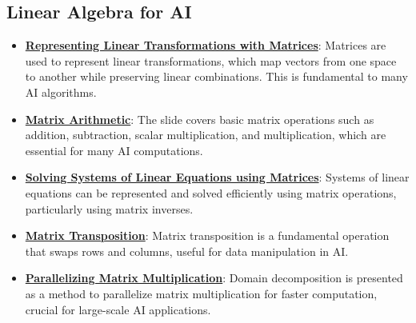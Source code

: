 \documentclass{article}%
\begin{document}
\subsection{Linear Algebra for AI}%
\label{subsec:LinearAlgebraforAI}%
\begin{itemize}[leftmargin=*]%
\item \href{https://purdue.brightspace.com/d2l/common/assets/pdfjs-d2l-dist/1.0.14-legacy/web/viewer.html?file=\%2Fcontent\%2Fenforced\%2F1095467-wl.202510.CS.24300.001\%2F04L1-Linear Algebra Primer.pdf\%3Fou\%3D1095467\&lang=en-us\&container=d2l-fileviewer-rendered-pdf\&fullscreen=d2l-fileviewer-rendered-pdf-dialog\&height=667#page=5}{\textbf{Representing Linear Transformations with Matrices}}: Matrices are used to represent linear transformations, which map vectors from one space to another while preserving linear combinations. This is fundamental to many AI algorithms.%
\item \href{https://purdue.brightspace.com/d2l/common/assets/pdfjs-d2l-dist/1.0.14-legacy/web/viewer.html?file=\%2Fcontent\%2Fenforced\%2F1095467-wl.202510.CS.24300.001\%2F04L1-Linear Algebra Primer.pdf\%3Fou\%3D1095467\&lang=en-us\&container=d2l-fileviewer-rendered-pdf\&fullscreen=d2l-fileviewer-rendered-pdf-dialog\&height=667#page=9}{\textbf{Matrix Arithmetic}}: The slide covers basic matrix operations such as addition, subtraction, scalar multiplication, and multiplication, which are essential for many AI computations.%
\item \href{https://purdue.brightspace.com/d2l/common/assets/pdfjs-d2l-dist/1.0.14-legacy/web/viewer.html?file=\%2Fcontent\%2Fenforced\%2F1095467-wl.202510.CS.24300.001\%2F04L1-Linear Algebra Primer.pdf\%3Fou\%3D1095467\&lang=en-us\&container=d2l-fileviewer-rendered-pdf\&fullscreen=d2l-fileviewer-rendered-pdf-dialog\&height=667#page=11}{\textbf{Solving Systems of Linear Equations using Matrices}}: Systems of linear equations can be represented and solved efficiently using matrix operations, particularly using matrix inverses.%
\item \href{https://purdue.brightspace.com/d2l/common/assets/pdfjs-d2l-dist/1.0.14-legacy/web/viewer.html?file=\%2Fcontent\%2Fenforced\%2F1095467-wl.202510.CS.24300.001\%2F04L1-Linear Algebra Primer.pdf\%3Fou\%3D1095467\&lang=en-us\&container=d2l-fileviewer-rendered-pdf\&fullscreen=d2l-fileviewer-rendered-pdf-dialog\&height=667#page=16}{\textbf{Matrix Transposition}}: Matrix transposition is a fundamental operation that swaps rows and columns, useful for data manipulation in AI.%
\item \href{https://purdue.brightspace.com/d2l/common/assets/pdfjs-d2l-dist/1.0.14-legacy/web/viewer.html?file=\%2Fcontent\%2Fenforced\%2F1095467-wl.202510.CS.24300.001\%2F04L1-Linear Algebra Primer.pdf\%3Fou\%3D1095467\&lang=en-us\&container=d2l-fileviewer-rendered-pdf\&fullscreen=d2l-fileviewer-rendered-pdf-dialog\&height=667#page=18}{\textbf{Parallelizing Matrix Multiplication}}: Domain decomposition is presented as a method to parallelize matrix multiplication for faster computation, crucial for large-scale AI applications.%
\end{itemize}
\end{document}
